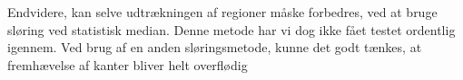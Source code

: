 {Endvidere, kan selve udtrækningen af regioner måske forbedres, ved at bruge
sløring ved statistisk median. Denne metode har vi dog ikke fået testet
ordentlig igennem. Ved brug af en anden sløringsmetode, kunne det godt
tænkes, at fremhævelse af kanter bliver helt overflødig

}

